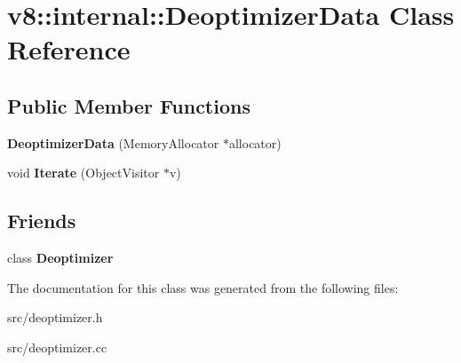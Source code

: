 \hypertarget{classv8_1_1internal_1_1_deoptimizer_data}{}\section{v8\+:\+:internal\+:\+:Deoptimizer\+Data Class Reference}
\label{classv8_1_1internal_1_1_deoptimizer_data}
\subsection*{Public Member Functions}
\begin{DoxyCompactItemize}
\item 
\hypertarget{classv8_1_1internal_1_1_deoptimizer_data_a498a0e445b21af454871f88b8d6a3a64}{}{\bfseries Deoptimizer\+Data} (Memory\+Allocator $\ast$allocator)\label{classv8_1_1internal_1_1_deoptimizer_data_a498a0e445b21af454871f88b8d6a3a64}

\item 
\hypertarget{classv8_1_1internal_1_1_deoptimizer_data_ae23624ee03c81be016584dc8567f3141}{}void {\bfseries Iterate} (Object\+Visitor $\ast$v)\label{classv8_1_1internal_1_1_deoptimizer_data_ae23624ee03c81be016584dc8567f3141}

\end{DoxyCompactItemize}
\subsection*{Friends}
\begin{DoxyCompactItemize}
\item 
\hypertarget{classv8_1_1internal_1_1_deoptimizer_data_aa89911581cd6ded032f998021aef9e5c}{}class {\bfseries Deoptimizer}\label{classv8_1_1internal_1_1_deoptimizer_data_aa89911581cd6ded032f998021aef9e5c}

\end{DoxyCompactItemize}


The documentation for this class was generated from the following files\+:\begin{DoxyCompactItemize}
\item 
src/deoptimizer.\+h\item 
src/deoptimizer.\+cc\end{DoxyCompactItemize}
